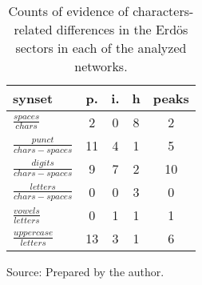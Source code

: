 \begin{table}[h!]
\begin{center}
\caption{Counts of evidence of characters-related differences in the Erd\"os sectors in each of the analyzed networks.}
	\def\arraystretch{1.5}
\begin{tabular}{| l || c | c | c || c |}\hline
{\bf synset} & {\bf p.} & {\bf i.} & {\bf h} & {\bf peaks} \\\hline\hline
$\frac{spaces}{chars}$ & 2  & 0  & 8  & 2 \\
$\frac{punct}{chars-spaces}$ & 11  & 4  & 1  & 5 \\
$\frac{digits}{chars-spaces}$ & 9  & 7  & 2  & 10 \\\hline
$\frac{letters}{chars-spaces}$ & 0  & 0  & 3  & 0 \\
$\frac{vowels}{letters}$ & 0  & 1  & 1  & 1 \\
$\frac{uppercase}{letters}$ & 13  & 3  & 1  & 6 \\\hline
\end{tabular}
\begin{flushleft}
		Source: Prepared by the author.\
\end{flushleft}
\end{center}
\end{table}
